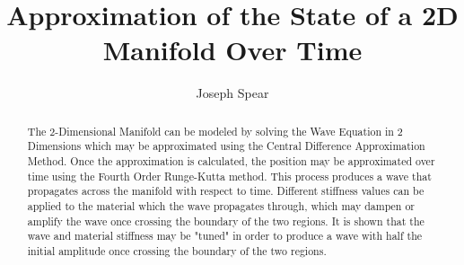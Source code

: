 \documentclass{article}
\begin{document}
\title{Approximation of the State of a 2D Manifold Over Time}
\author{Joseph Spear}

\maketitle

\begin{abstract}
\justify
The 2-Dimensional Manifold can be modeled by solving the Wave Equation in 2 Dimensions which may be approximated using the Central Difference Approximation Method. Once the approximation is calculated, the position may be approximated over time using the Fourth Order Runge-Kutta method. This process produces a wave that propagates across the manifold with respect to time. Different stiffness values can be applied to the material which the wave propagates through, which may dampen or amplify the wave once crossing the boundary of the two regions. It is shown that the wave and material stiffness may be "tuned" in order to produce a wave with half the initial amplitude once crossing the boundary of the two regions.

\end{abstract}
\end{document}
